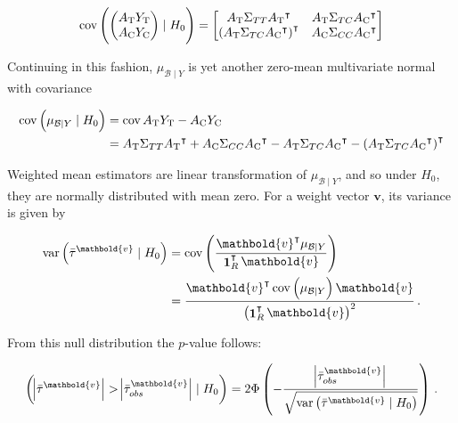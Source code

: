 \documentclass[letter]{article}
\let\Pr\relax
\DeclareMathOperator{\Pr}{\mathbb{P}}
\DeclareMathOperator{\cov}{{cov}}
\DeclareMathOperator{\var}{{var}}
\DeclareMathOperator{\ones}{\mathbf{1}}
\newcommand{\trans}{^{\intercal}}
\newcommand{\treat}{\mathrm{T}}
\newcommand{\ctrol}{\mathrm{C}}
\newcommand{\vvec}{\mathbold{v}}
\newcommand{\border}{\mathcal{B}}
\newcommand{\numsent}{R}
\begin{document}
\begin{equation}
    \cov \del{\begin{pmatrix}A_\treat{} Y_\treat{} \\ A_\ctrol{} Y_\ctrol{} \end{pmatrix} \mid H_0 } = \begin{bmatrix}
                        A_\treat{} \Sigma_{TT} A_\treat{}\trans & A_\treat{} \Sigma_{TC} A_\ctrol{}\trans \\
                        \del{A_\treat{} \Sigma_{TC} A_\ctrol{} \trans}\trans & A_\ctrol{} \Sigma_{CC} A_\ctrol{}\trans
                    \end{bmatrix}
\end{equation}

Continuing in this fashion, \(\mu_{\border \mid Y}\) is yet another zero-mean multivariate normal with covariance
    


    	\begin{equation}
\begin{split}
    \cov \del{\mu_{\border \mid Y} \mid H_0} &= \cov{ A_\treat{} Y_\treat{} - A_\ctrol{} Y_\ctrol{} } \\
        &= A_\treat{} \Sigma_{TT} A_\treat{}\trans + A_\ctrol{} \Sigma_{CC} A_\ctrol{}\trans - A_\treat{} \Sigma_{TC} A_\ctrol{}\trans -  \del{A_\treat{}\Sigma_{TC} A_\ctrol{}\trans}\trans
\end{split}
\end{equation}
    


    	Weighted mean estimators are linear transformation of \(\mu_{\border \mid Y}\), and so under \(H_0\), they are normally distributed with mean zero.
For a weight vector \(\vvec\), its variance is given by

\begin{equation}
\begin{aligned}
    \var\del{\bar{\tau}^\vvec \mid H_0} &= \cov\del{ \frac{\vvec \trans \mu_{\border \mid Y}}{\ones_{\numsent}\trans \vvec}} \\
    &= \frac{\vvec \trans \cov \del{\mu_{\border \mid Y}} \vvec}{\del{\ones_{\numsent}\trans \vvec}^2}
    \,.
\end{aligned}
\end{equation}
    


    	From this null distribution the \(p\)-value follows:

\begin{equation}
    \Pr\del{ \abs{\bar{\tau}^\vvec} > \abs{\bar{\tau}_{obs}^\vvec} \mid H_0} = 2 \Phi\del{ -\frac{\abs{\bar{\tau}_{obs}^\vvec}}{\sqrt{\var\del{\bar{\tau}^\vvec \mid H_0}}} }\,.
\end{equation}
\end{document}
